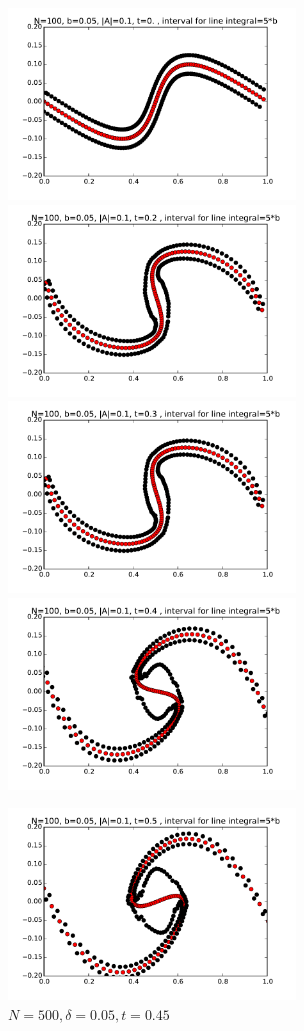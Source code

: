 \documentclass[12pt,twoside]{article}
\begin{document}
\begin{figure}[ht]
\centering
\begin{minipage}[b]{0.45\linewidth}
\includegraphics[width=3in,height=2in]{t00.pdf}
\includegraphics[width=3in,height=2in]{t02.pdf}
\includegraphics[width=3in,height=2in]{t03.pdf}
\includegraphics[width=3in,height=2in]{t04.pdf}
\caption{$N=500 , \delta=0.05 ,  t=0.45$ }
\end{minipage}
\quad
\begin{minipage}[b]{0.45\linewidth}
\includegraphics[width=3in,height=2in]{t05.pdf}

\end{minipage}
\end{figure}
\end{document}
